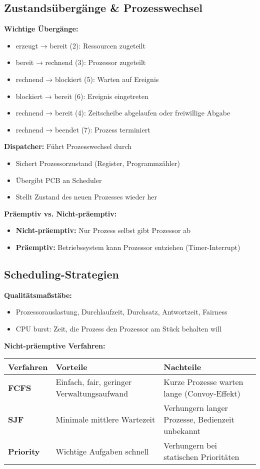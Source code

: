 \documentclass[9pt,a4paper]{extarticle}
\begin{document}
\begin{multicols*}{2}
\subsection{Zustandsübergänge \& Prozesswechsel}
\textbf{Wichtige Übergänge:}
\begin{itemize}
\item erzeugt → bereit (2): Ressourcen zugeteilt
\item bereit → rechnend (3): Prozessor zugeteilt
\item rechnend → blockiert (5): Warten auf Ereignis
\item blockiert → bereit (6): Ereignis eingetreten
\item rechnend → bereit (4): Zeitscheibe abgelaufen oder freiwillige Abgabe
\item rechnend → beendet (7): Prozess terminiert
\end{itemize}

\textbf{Dispatcher:} Führt Prozesswechsel durch
\begin{itemize}
\item Sichert Prozessorzustand (Register, Programmzähler)
\item Übergibt PCB an Scheduler
\item Stellt Zustand des neuen Prozesses wieder her
\end{itemize}

\textbf{Präemptiv vs. Nicht-präemptiv:}
\begin{itemize}
\item \textbf{Nicht-präemptiv:} Nur Prozess selbst gibt Prozessor ab
\item \textbf{Präemptiv:} Betriebssystem kann Prozessor entziehen (Timer-Interrupt)
\end{itemize}

\subsection{Scheduling-Strategien}
\textbf{Qualitätsmaßstäbe:}
\begin{itemize}
\item Prozessorauslastung, Durchlaufzeit, Durchsatz, Antwortzeit, Fairness
\item CPU burst: Zeit, die Prozess den Prozessor am Stück behalten will
\end{itemize}

\textbf{Nicht-präemptive Verfahren:}

\begin{center}
\begin{tabular}{|p{2.2cm}|p{2.8cm}|p{2.8cm}|}
\hline
\textbf{Verfahren} & \textbf{Vorteile} & \textbf{Nachteile} \\
\hline
\textbf{FCFS} & Einfach, fair, geringer Verwaltungsaufwand & Kurze Prozesse warten lange (Convoy-Effekt) \\
\hline
\textbf{SJF} & Minimale mittlere Wartezeit & Verhungern langer Prozesse, Bedienzeit unbekannt \\
\hline
\textbf{Priority} & Wichtige Aufgaben schnell & Verhungern bei statischen Prioritäten \\
\hline
\end{tabular}
\end{center}


\end{multicols*}
\end{document}
